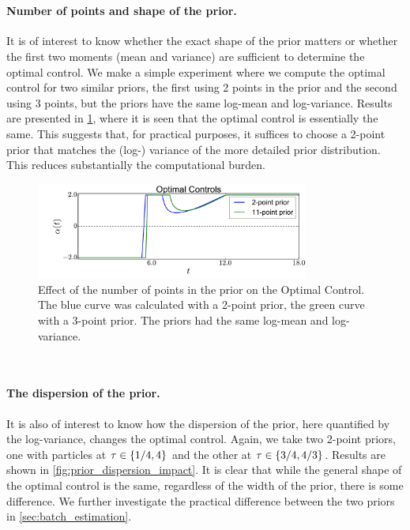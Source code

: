 \

\paragraph{Number of points and shape of the prior.} 
It is of interest to know whether the exact shape of the prior matters or whether the first two
moments (mean and variance) are sufficient to determine the optimal control. We
make a simple experiment where we compute the optimal control for two
similar priors, the first using 2 points 
in the prior and the second using 3 points, but the priors have the same
log-mean and log-variance. Results are presented in
\cref{fig:prior_shape_impact}, where it is seen that
the optimal control is essentially the same. This suggests that, for practical
purposes, it suffices to choose a 2-point prior that matches
the (log-) variance of the more detailed prior distribution. This
reduces substantially the computational burden.



\begin{figure}[htp]
\begin{center}
  \includegraphics[width=0.8\textwidth]{Figs/AdjointOptimizer/NumberOfTausEffect.pdf}
  \caption[Effect of number of points in prior on Optimal Control]{Effect of the
  number of points in the prior on the Optimal Control. The blue curve was calculated with a 2-point prior, the
  green curve with a 3-point prior. The priors had the same log-mean and log-variance. } 
  \label{fig:prior_shape_impact}
\end{center}
\end{figure}

\

\paragraph{The dispersion of the prior.}
It is also of
interest to know how the dispersion of the prior, here quantified
by the log-variance, changes the optimal control. Again, we take two
2-point priors, one with 
particles at ${ \tau } \in \{1/4, 4\}$ and the other at ${ \tau } \in
\{3/4,4/3\}$. Results
are shown in \cref{fig:prior_dispersion_impact}. It is clear that while the
general shape of the optimal control is the same, regardless of the width of
the prior, there is some difference. We further investigate the
practical difference between the two priors in 
\cref{sec:batch_estimation}.
 
